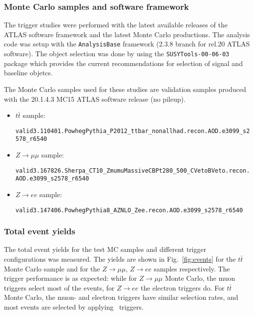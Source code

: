 \subsubsection{Monte Carlo samples and software framework}

The trigger studies were performed with the latest available releases of the ATLAS software framework and the latest Monte Carlo productions. The analysis code was setup with the \texttt{AnalysisBase} framework (2.3.8 branch for rel.20 ATLAS software). The object selection was done by using the \texttt{SUSYTools-00-06-03} package which provides the current recommendations for selection of signal and baseline objetcs. 

The Monte Carlo samples used for these studies are validation samples produced with the 20.1.4.3 MC15 ATLAS software release (no pileup). 

\begin{itemize}

\item $t \bar{t}$ sample: 

\texttt{valid3.110401.PowhegPythia\_P2012\_ttbar\_nonallhad.recon.AOD.e3099\_s2578\_r6540}

\item $Z \rightarrow \mu \mu$ sample:  

\texttt{valid3.167826.Sherpa\_CT10\_ZmumuMassiveCBPt280\_500\_CVetoBVeto.recon.AOD.e3099\_s2578\_r6540}

\item $Z \rightarrow e e$ sample: 

\texttt{valid3.147406.PowhegPythia8\_AZNLO\_Zee.recon.AOD.e3099\_s2578\_r6540}

\end{itemize}

\subsubsection{Total event yields}

The total event yields for the test MC samples and different trigger configurations was measured. The yields are shown in Fig.~\ref{fig:events} for the $t \bar{t}$ Monte Carlo sample and for the $Z \rightarrow \mu \mu$, $Z \rightarrow ee$ samples respectively. The trigger performance is as expected: while for $Z \rightarrow \mu \mu$ Monte Carlo, the muon triggers select most of the events, for $Z \rightarrow ee$ the electron triggers do. For $t \bar{t}$ Monte Carlo, the muon- and electron triggers have similar selection rates, and most events are selected by applying \met\ triggers.

